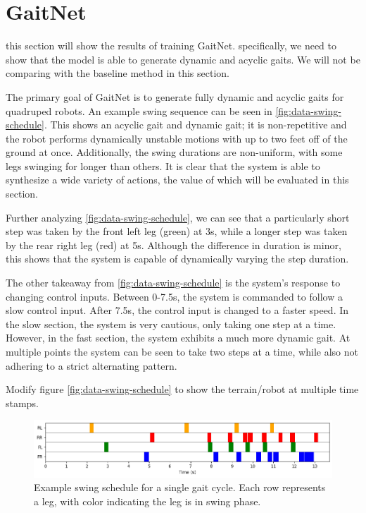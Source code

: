 \section{GaitNet}

\begin{todo}
  this section will show the results of training GaitNet.
  specifically, we need to show that the model is able to generate
  dynamic and acyclic gaits. We will not be comparing with the baseline
  method in this section.
\end{todo}

The primary goal of GaitNet is to generate fully dynamic and acyclic
gaits for quadruped robots. An example swing sequence can be seen in
\autoref{fig:data-swing-schedule}. This shows an acyclic
gait and dynamic gait; it is non-repetitive and the robot performs
dynamically unstable motions with up to two feet off of the ground
at once.
Additionally, the swing durations are non-uniform, with some legs
swinging for longer than others. It is clear that the system is able to
synthesize a wide variety of actions, the value of which will be evaluated
in this section.

Further analyzing \autoref{fig:data-swing-schedule}, we can see that
a particularly short step was taken by the front left leg (green) at 3s,
while a longer step was taken by the rear right leg (red) at 5s. Although
the difference in duration is minor, this shows that the system is capable
of dynamically varying the step duration.

The other takeaway from \autoref{fig:data-swing-schedule} is the
system's response to changing control inputs. Between 0-7.5s, the
system is commanded to follow a slow control input. After 7.5s, the
control input is changed to a faster speed. In the slow section,
the system is very cautious, only taking one step at a time. However,
in the fast section, the system exhibits a much more dynamic gait. At
multiple points the system can be seen to take two steps at a time,
while also not adhering to a strict alternating pattern.

\begin{todo}
  Modify figure \autoref{fig:data-swing-schedule} to show
  the terrain/robot at multiple time stamps.
\end{todo}

\begin{figure}[H]
  \centering
  \includegraphics[width=\textwidth]{images/data/swing-schedule.png}
  \caption{Example swing schedule for a single gait cycle. Each row
  represents a leg, with color indicating the leg is in swing phase.}
  \label{fig:data-swing-schedule}
\end{figure}

